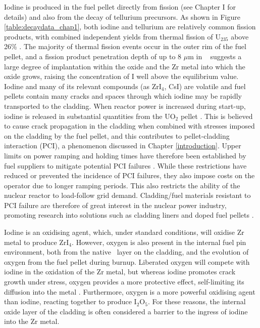 Iodine is produced in the fuel pellet directly from fission (see Chapter I for details) and also from the decay of tellurium precursors. As shown in Figure \ref{table:decaydata_chap1}, both iodine and tellurium are relatively common fission products, with combined independent yields from thermal fission of U$_{235}$ above 26\% \cite{kennett1956mass, iodine129fissionyield, imanishi1976independent, iodinefissionyields, iodine132, amiel1975odd, iaeafissionyield}. The majority of thermal fission events occur in the outer rim of the fuel pellet, and a fission product penetration depth of up to 8 $\mu$m in \zirconia\ \cite{degueldre2001behaviour} suggests a large degree of implantation within the oxide and the Zr metal into which the oxide grows, raising the concentration of I well above the equilibrium value. Iodine and many of its relevant compounds (as ZrI$_{4}$, CsI) are volatile and fuel pellets contain many cracks and spaces through which iodine may be rapidly transported to the cladding. When reactor power is increased during start-up, iodine is released in substantial quantities from the UO$_{2}$ pellet \cite{peehs1982experimental}. This is believed to cause crack propagation in the cladding when combined with stresses imposed on the cladding by the fuel pellet, and this contributes to pellet-cladding interaction (PCI), a phenomenon discussed in Chapter \ref{introduction}. Upper limits on power ramping and holding times have therefore been established by fuel suppliers to mitigate potential PCI failures \cite{yagnik2005effect}. While these restrictions have reduced or prevented the incidence of PCI failures, they also impose costs on the operator due to longer ramping periods. This also restricts the ability of the nuclear reactor to load-follow grid demand. Cladding/fuel materials resistant to PCI failure are therefore of great interest in the nuclear power industry, promoting research into solutions such as cladding liners and doped fuel pellets \cite{nonon2005pci,yang2012effect}. 



Iodine is an oxidising agent, which, under standard conditions, will oxidise Zr metal to produce ZrI$_{4}$. However, oxygen is also present in the internal fuel pin environment, both from the native \zirconia\ layer on the cladding, and the evolution of oxygen from the fuel pellet during burnup. Liberated oxygen will compete with iodine in the oxidation of the Zr metal, but whereas iodine promotes crack growth under stress, oxygen provides a more protective effect, self-limiting its diffusion into the metal \cite{farina2002stress, causey2005review}. Furthermore, oxygen is a more powerful oxidising agent than iodine, reacting together to produce I${_2}$O$_{5}$. For these reasons, the internal oxide layer of the cladding is often considered a barrier to the ingress of iodine into the Zr metal. 

